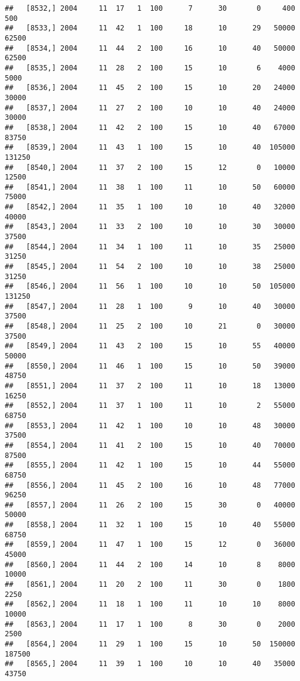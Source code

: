 \documentclass{article}\usepackage[]{graphicx}\usepackage[]{color}
\makeatletter
\newenvironment{kframe}{%
 \def\at@end@of@kframe{}%
 \ifinner\ifhmode%
  \def\at@end@of@kframe{\end{minipage}}%
  \begin{minipage}{\columnwidth}%
 \fi\fi%
 \def\FrameCommand##1{\hskip\@totalleftmargin \hskip-\fboxsep
 \colorbox{shadecolor}{##1}\hskip-\fboxsep
     \hskip-\linewidth \hskip-\@totalleftmargin \hskip\columnwidth}%
 \MakeFramed {\advance\hsize-\width
   \@totalleftmargin\z@ \linewidth\hsize
   \@setminipage}}%
 {\par\unskip\endMakeFramed%
 \at@end@of@kframe}
\newenvironment{knitrout}{}{} %
\makeatother
\begin{document}
\begin{knitrout}
\begin{kframe}
\begin{verbatim}
##   [8532,] 2004     11  17   1  100      7      30       0     400     500
##   [8533,] 2004     11  42   1  100     18      10      29   50000   62500
##   [8534,] 2004     11  44   2  100     16      10      40   50000   62500
##   [8535,] 2004     11  28   2  100     15      10       6    4000    5000
##   [8536,] 2004     11  45   2  100     15      10      20   24000   30000
##   [8537,] 2004     11  27   2  100     10      10      40   24000   30000
##   [8538,] 2004     11  42   2  100     15      10      40   67000   83750
##   [8539,] 2004     11  43   1  100     15      10      40  105000  131250
##   [8540,] 2004     11  37   2  100     15      12       0   10000   12500
##   [8541,] 2004     11  38   1  100     11      10      50   60000   75000
##   [8542,] 2004     11  35   1  100     10      10      40   32000   40000
##   [8543,] 2004     11  33   2  100     10      10      30   30000   37500
##   [8544,] 2004     11  34   1  100     11      10      35   25000   31250
##   [8545,] 2004     11  54   2  100     10      10      38   25000   31250
##   [8546,] 2004     11  56   1  100     10      10      50  105000  131250
##   [8547,] 2004     11  28   1  100      9      10      40   30000   37500
##   [8548,] 2004     11  25   2  100     10      21       0   30000   37500
##   [8549,] 2004     11  43   2  100     15      10      55   40000   50000
##   [8550,] 2004     11  46   1  100     15      10      50   39000   48750
##   [8551,] 2004     11  37   2  100     11      10      18   13000   16250
##   [8552,] 2004     11  37   1  100     11      10       2   55000   68750
##   [8553,] 2004     11  42   1  100     10      10      48   30000   37500
##   [8554,] 2004     11  41   2  100     15      10      40   70000   87500
##   [8555,] 2004     11  42   1  100     15      10      44   55000   68750
##   [8556,] 2004     11  45   2  100     16      10      48   77000   96250
##   [8557,] 2004     11  26   2  100     15      30       0   40000   50000
##   [8558,] 2004     11  32   1  100     15      10      40   55000   68750
##   [8559,] 2004     11  47   1  100     15      12       0   36000   45000
##   [8560,] 2004     11  44   2  100     14      10       8    8000   10000
##   [8561,] 2004     11  20   2  100     11      30       0    1800    2250
##   [8562,] 2004     11  18   1  100     11      10      10    8000   10000
##   [8563,] 2004     11  17   1  100      8      30       0    2000    2500
##   [8564,] 2004     11  29   1  100     15      10      50  150000  187500
##   [8565,] 2004     11  39   1  100     10      10      40   35000   43750

\end{verbatim}
\end{kframe}
\end{knitrout}
\end{document}

